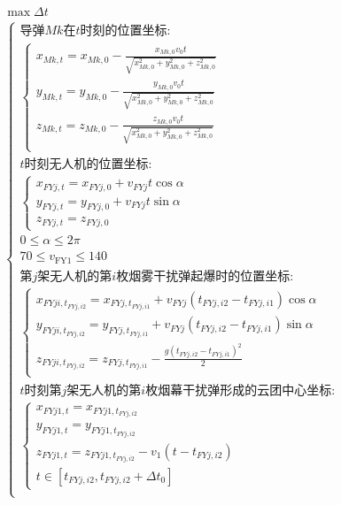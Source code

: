 \documentclass[../main.tex]{subfiles}
\begin{document}
\begin{align}
  \begin{array}{c}
	 \max \Delta t
  \\
\left\{ \begin{array}{l}
\text{导弹$Mk$在$t$时刻的位置坐标:}\\
	\left\{ \begin{array}{l}
	x_{Mk,t}=x_{Mk,0}-\frac{x_{Mk,0}v_0t}{\sqrt{x_{Mk,0}^{2}+y_{Mk,0}^{2}+z_{Mk,0}^{2}}}\\
	y_{Mk,t}=y_{Mk,0}-\frac{y_{Mk,0}v_0t}{\sqrt{x_{Mk,0}^{2}+y_{Mk,0}^{2}+z_{Mk,0}^{2}}}\\
	z_{Mk,t}=z_{Mk,0}-\frac{z_{Mk,0}v_0t}{\sqrt{x_{Mk,0}^{2}+y_{Mk,0}^{2}+z_{Mk,0}^{2}}}\\
\end{array} \right. \\
	t\text{时刻无人机的位置坐标:}\\
	\begin{cases}
x_{FYj,t} = x_{FYj,0} + v_{FYj} t \cos\alpha \\
y_{FYj,t} = y_{FYj,0} + v_{FYj} t \sin\alpha \\
z_{FYj,t} = z_{FYj,0}
\end{cases}\\
	0\leq \alpha \leq 2\pi\\
  70 \leq v_{\text{FY1}} \leq 140\\
	\text{第$j$架无人机的第$i$枚烟雾干扰弹起爆时的位置坐标:}\\
	\left\{ \begin{array}{l}
	x_{FYji,t_{FYj,i2}}=x_{FYj,t_{FYj,i1}}+v_{FYj}\left( t_{FYj,i2}-t_{FYj,i1} \right) \cos \alpha\\
	y_{FYji,t_{FYj,i2}}=y_{FYj,t_{FYj,i1}}+v_{FYj}\left( t_{FYj,i2}-t_{FYj,i1} \right) \sin \alpha\\
	z_{FYji,t_{FYj,i2}}=z_{FYj,t_{FYj,i1}}-\frac{g\left( t_{FYj,i2}-t_{FYj,i1} \right) ^2}{2}\\
\end{array} \right.  \\
	t\text{时刻第$j$架无人机的第$i$枚烟幕干扰弹形成的云团中心坐标:}\\
	\left\{ \begin{array}{l}
	x_{FYj1,t}=x_{FYj1,t_{FYj,i2}}\\
	y_{FYj1,t}=y_{FYj1,t_{FYj,i2}}\\
	z_{FYj1,t}=z_{FYj1,t_{FYj,i2}}-v_1\left( t-t_{FYj,i2} \right)\\
	t\in \left[ t_{FYj,i2},t_{FYj,i2}+\Delta t_0 \right]
\end{array} \right.\\

\end{array}
\end{array}
\end{align}
\end{document}
